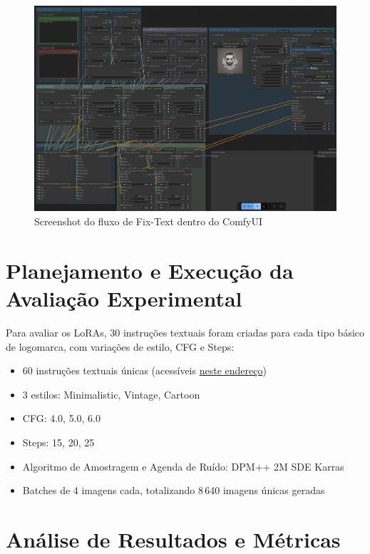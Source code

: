 \documentclass[12pt, %
openright, 
oneside, %
a4paper,    %
brazil]{facom-ufu-abntex2}
\begin{document}
\begin{figure}[H]
    \centering
	\includegraphics[width=\linewidth]{figuras/fix-text-flow.png}
	\caption[Fluxo Fix-Text (ComfyUI)]{Screenshot do fluxo de Fix-Text dentro do ComfyUI}
	\label{fig:fixTextFlow}
\end{figure}

\section{Planejamento e Execução da Avaliação Experimental}

Para avaliar os LoRAs, 30 instruções textuais foram criadas para cada tipo básico de logomarca, com variações de estilo, CFG e Steps:

\begin{itemize}
    \item 60 instruções textuais únicas (acessíveis \href{https://github.com/tornellihenrique/tcc-stable-diffusion-logos/tree/main/result-gathering/prompts}{neste endereço})
    \item 3 estilos: Minimalistic, Vintage, Cartoon
    \item CFG: 4.0, 5.0, 6.0
    \item Steps: 15, 20, 25
    \item Algoritmo de Amostragem e Agenda de Ruído: DPM++ 2M SDE Karras
    \item Batches de 4 imagens cada, totalizando 8\,640 imagens únicas geradas
\end{itemize}

\section{Análise de Resultados e Métricas}
\end{document}
